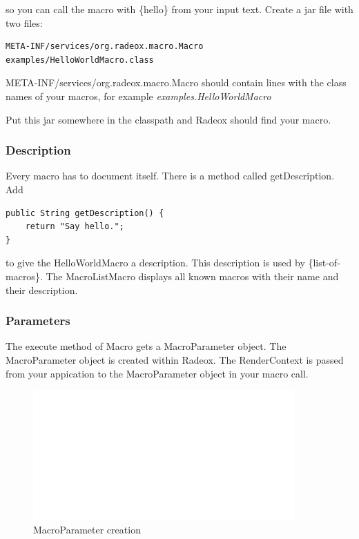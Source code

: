 \documentclass[a4paper,pdftex]{article}
\begin{document}
so you can call the macro with \{hello\} from your input text. Create a jar file with two files:

\begin{verbatim}
META-INF/services/org.radeox.macro.Macro
examples/HelloWorldMacro.class
\end{verbatim}

META-INF/services/org.radeox.macro.Macro should contain lines with the class 
names of your macros, for example {\it examples.HelloWorldMacro}

Put this jar somewhere in the classpath and Radeox should find your macro.

\subsubsection{Description}

Every macro has to document itself. There is a method called getDescription. Add

\begin{verbatim}
public String getDescription() {
    return "Say hello.";
}
\end{verbatim}

to give the HelloWorldMacro a description. This description is used by 
\{list-of-macros\}.  The MacroListMacro displays all known macros 
with their name and their description.

\subsubsection{Parameters}

The execute method of Macro gets a MacroParameter object. The MacroParameter
object is created within Radeox. The RenderContext is passed from your appication 
to the MacroParameter object in your macro call.

\begin{figure}[ht]
    \centering
    \includegraphics[keepaspectratio,width=10cm]{images/MacroParameter}
     \caption{\small\textsf MacroParameter creation}
\end{figure}
\end{document}
